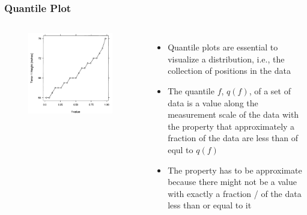\documentclass[aspectratio=1610]{beamer}
\begin{document}
\begin{frame}
	\frametitle{Quantile Plot}
	\begin{columns}
		\begin{figure}
			\begin{center}
				\includegraphics[width=0.95\textwidth]{figures/quantile_plot.png}
			\end{center}
		\end{figure}
		\begin{itemize}
			\item Quantile plots are essential to visualize a distribution, i.e., the
			      collection of positions in the data
			\item The quantile $f$, $q(f)$, of a set of data is a value along the
			      measurement scale of the data with the property that approximately a
			      fraction of the data are less than of equl to $q(f)$
			\item The property has to be approximate because there might not be a
			      value with exactly a fraction / of the data less than or equal to it
		\end{itemize}
	\end{columns}
\end{frame}
\end{document}

